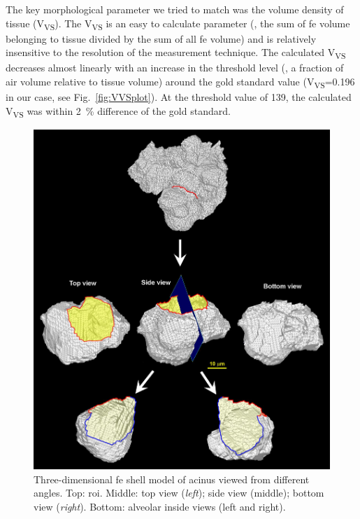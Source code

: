 The key morphological parameter we tried to match was the volume density of tissue (V\textsubscript{VS}). The V\textsubscript{VS} is an easy to calculate parameter (\ie, the sum of \ac{fe} volume belonging to tissue divided by the sum of all \ac{fe} volume) and is relatively insensitive to the resolution of the measurement technique. The calculated V\textsubscript{VS} decreases almost linearly with an increase in the threshold level (\ie, a fraction of air volume relative to tissue volume) around the gold standard value (V\textsubscript{VS}=0.196 in our case, see Fig.~\ref{fig:VVSplot}). At the threshold value of 139, the calculated V\textsubscript{VS} was within \SI{2}{\percent} difference of the gold standard.

\begin{figure}[p]
	\centering
	\includegraphics[width=\imsize]{img/Tsuda2008/Tsuda-10}
	\caption[Three-dimensional FE shell model of a partial acinus]{Three-dimensional \ac{fe} shell model of acinus viewed from different angles. Top: \ac{roi}. Middle: top view (\textit{left}); side view (middle); bottom view (\textit{right}). Bottom: alveolar inside views (left and right).}
	\label{fig:alveolus}
\end{figure}

